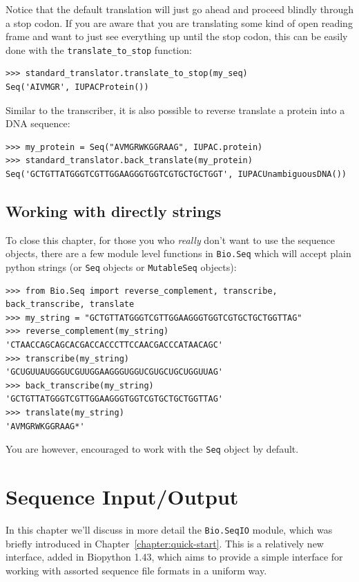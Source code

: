\documentclass{report}
\begin{document}
Notice that the default translation will just go ahead and proceed blindly through a stop codon. If you are aware that you are translating some kind of open reading frame and want to just see everything up until the stop codon, this can be easily done with the \verb|translate_to_stop| function:

\begin{verbatim}
>>> standard_translator.translate_to_stop(my_seq)
Seq('AIVMGR', IUPACProtein())
\end{verbatim}

Similar to the transcriber, it is also possible to reverse translate a protein into a DNA sequence:

\begin{verbatim}
>>> my_protein = Seq("AVMGRWKGGRAAG", IUPAC.protein)
>>> standard_translator.back_translate(my_protein)
Seq('GCTGTTATGGGTCGTTGGAAGGGTGGTCGTGCTGCTGGT', IUPACUnambiguousDNA())
\end{verbatim}

\section{Working with directly strings}

To close this chapter, for those you who \emph{really} don't want to use the sequence objects, there are a few module level functions in \verb|Bio.Seq| which will accept plain python strings (or \verb|Seq| objects or \verb|MutableSeq| objects):

\begin{verbatim}
>>> from Bio.Seq import reverse_complement, transcribe, back_transcribe, translate
>>> my_string = "GCTGTTATGGGTCGTTGGAAGGGTGGTCGTGCTGCTGGTTAG"
>>> reverse_complement(my_string)
'CTAACCAGCAGCACGACCACCCTTCCAACGACCCATAACAGC'
>>> transcribe(my_string)
'GCUGUUAUGGGUCGUUGGAAGGGUGGUCGUGCUGCUGGUUAG'
>>> back_transcribe(my_string)
'GCTGTTATGGGTCGTTGGAAGGGTGGTCGTGCTGCTGGTTAG'
>>> translate(my_string)
'AVMGRWKGGRAAG*'
\end{verbatim}

\noindent You are however, encouraged to work with the \verb|Seq| object by default.

\chapter{Sequence Input/Output}
\label{chapter:Bio.SeqIO}

In this chapter we'll discuss in more detail the \verb|Bio.SeqIO| module, which was briefly introduced in Chapter~\ref{chapter:quick-start}. This is a relatively new interface, added in Biopython 1.43, which aims to provide a simple interface for working with assorted sequence file formats in a uniform way.
\end{document}
